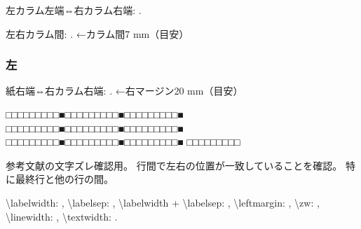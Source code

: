 \documentclass{FITpaper}
\begin{document}
左カラム左端⇔右カラム右端:
\prntlen{\textwidth}.

左右カラム間:
\prntlen{\columnsep}.
←カラム間7 mm（目安）

\subsubsection{左}

\newlength{\myright}
\setlength{\myright}{\paperwidth}

\addtolength\myright{-\myleft}
\addtolength\myright{-\textwidth}

紙右端⇔右カラム右端:
\prntlen{\myright}.
←右マージン20 mm（目安）


\begin{thebibliography}{9}

  □□□□□□□□□■□□□□□□□□□■□□□□□□□□□■
  □□□□□□□□□■□□□□□□□□□■□□□□□□□□□■
  □□□□□□□□□■□□□□□□□□□■□□□□□□□□□■
  □□□□□□□□□

  参考文献の文字ズレ確認用。
  行間で左右の位置が一致していることを確認。
  特に最終行と他の行の間。

  \textbackslash labelwidth: \the{},
  \textbackslash labelsep: \the{},
  \textbackslash labelwidth + \textbackslash labelsep:
  \newlength{\temptotal}\setlength{\temptotal}{\labelwidth}
  \addtolength{\temptotal}{\labelsep}\the\temptotal,
  \textbackslash leftmargin: \the\leftmargin,
  \textbackslash zw: \the\myzw,
  \textbackslash linewidth: \the\linewidth,
  \textbackslash textwidth: \the\textwidth.

\end{thebibliography}
\end{document}
